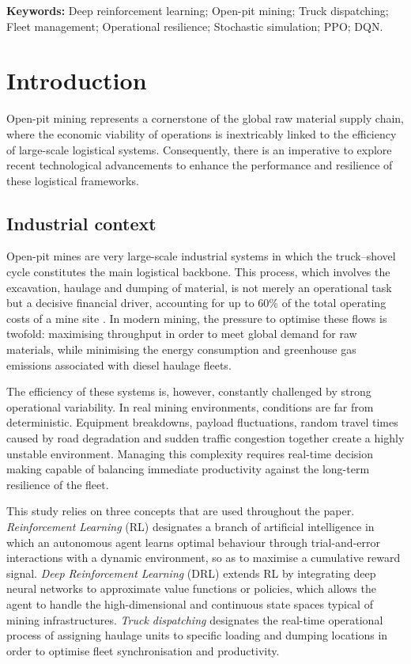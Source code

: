 \documentclass[11pt,a4paper]{article}
\begin{document}
\noindent\textbf{Keywords:} Deep reinforcement learning; Open-pit mining; Truck dispatching; Fleet management; Operational resilience; Stochastic simulation; PPO; DQN.

\section{Introduction}
\label{sec:intro}

Open-pit mining represents a cornerstone of the global raw material supply chain, where the economic viability of operations is inextricably linked to the efficiency of large-scale logistical systems. Consequently, there is an imperative to explore recent technological advancements to enhance the performance and resilience of these logistical frameworks.

\subsection{Industrial context}

Open-pit mines are very large-scale industrial systems in which the truck--shovel cycle constitutes the main logistical backbone. This process, which involves the excavation, haulage and dumping of material, is not merely an operational task but a decisive financial driver, accounting for up to 60\% of the total operating costs of a mine site \cite{Afrapoli2017}. In modern mining, the pressure to optimise these flows is twofold: maximising throughput in order to meet global demand for raw materials, while minimising the energy consumption and greenhouse gas emissions associated with diesel haulage fleets.

The efficiency of these systems is, however, constantly challenged by strong operational variability. In real mining environments, conditions are far from deterministic. Equipment breakdowns, payload fluctuations, random travel times caused by road degradation and sudden traffic congestion together create a highly unstable environment. Managing this complexity requires real-time decision making capable of balancing immediate productivity against the long-term resilience of the fleet.

This study relies on three concepts that are used throughout the paper. \textit{Reinforcement Learning} (RL) designates a branch of artificial intelligence in which an autonomous agent learns optimal behaviour through trial-and-error interactions with a dynamic environment, so as to maximise a cumulative reward signal. \textit{Deep Reinforcement Learning} (DRL) extends RL by integrating deep neural networks to approximate value functions or policies, which allows the agent to handle the high-dimensional and continuous state spaces typical of mining infrastructures. \textit{Truck dispatching} designates the real-time operational process of assigning haulage units to specific loading and dumping locations in order to optimise fleet synchronisation and productivity.
\end{document}

